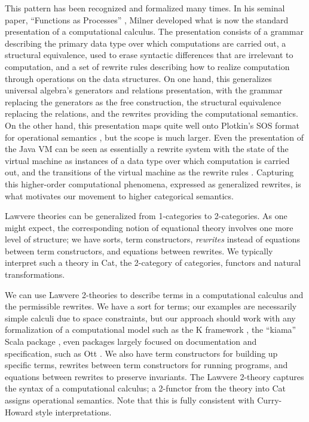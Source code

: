 \documentclass{llncs}
\renewcommand{\:}{\colon}
\begin{document}
  This pattern has been recognized and formalized many times.  In his
  seminal paper, ``Functions as Processes''
  \cite{DBLP:journals/mscs/Milner92}, Milner developed what is now the
  standard presentation of a computational calculus.  The presentation
  consists of a grammar describing the primary data type over which
  computations are carried out, a structural equivalence, used to
  erase syntactic differences that are irrelevant to computation, and
  a set of rewrite rules describing how to realize computation through
  operations on the data structures.  On one hand, this generalizes
  universal algebra's generators and relations presentation, with the
  grammar replacing the generators as the free construction, the
  structural equivalence replacing the relations, and the rewrites
  providing the computational semantics.  On the other hand, this
  presentation maps quite well onto Plotkin's SOS format for
  operational semantics \cite{Plotkin04theorigins}, but the scope is
  much larger.  Even the presentation of the Java VM can be seen as
  essentially a rewrite system with the state of the virtual machine
  as instances of a data type over which computation is carried out,
  and the transitions of the virtual machine as the rewrite rules
  \cite{DBLP:conf/oopsla/IgarashiPW99}.  Capturing this higher-order
  computational phenomena, expressed as generalized rewrites, is what
  motivates our movement to higher categorical semantics.
  

  Lawvere theories can be generalized from  1-categories to 2-categories.  As one might expect, the corresponding notion of equational theory involves one more level of structure; we have sorts, term constructors, {\em rewrites} instead of equations between term constructors, and equations between rewrites.  We typically interpret such a theory in Cat, the  2-category of categories, functors and natural transformations.

  We can use Lawvere 2-theories to describe terms in a computational calculus and the permissible rewrites.  We have a sort for terms;  our examples are necessarily simple calculi due to space constraints, but our approach should work with any formalization of a computational model such as the K framework \cite{DBLP:journals/jlp/RosuS10}, the  ``kiama'' Scala package \cite{DBLP:conf/gttse/Sloane09}, even packages largely focused on documentation and specification, such as Ott  \cite{DBLP:journals/jfp/SewellNOPRSS10}.  We also have term constructors for building up specific terms, rewrites between term constructors for running programs, and equations between rewrites to preserve invariants.  The Lawvere 2-theory captures the syntax of a computational calculus; a 2-functor from the theory into Cat assigns operational semantics.  Note that this is fully consistent with Curry-Howard style interpretations.
\end{document}
